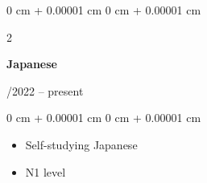 \documentclass[10pt, letterpaper]{article}
\newenvironment{highlights}{
    \begin{itemize}[
        topsep=0.10 cm,
        parsep=0.10 cm,
        partopsep=0pt,
        itemsep=0pt,
        leftmargin=0 cm + 10pt
    ]
}{
    \end{itemize}
}
\newenvironment{onecolentry}{
    \begin{adjustwidth}{
        0 cm + 0.00001 cm
    }{
        0 cm + 0.00001 cm
    }
}{
    \end{adjustwidth}
}
\newenvironment{twocolentry}[2][]{
    \onecolentry
    \def\secondColumn{#2}
    \setcolumnwidth{\fill, 4.5 cm}
    \begin{paracol}{2}
}{
    \switchcolumn \raggedleft \secondColumn
    \end{paracol}
    \endonecolentry
} %
\begin{document}
        \vspace{0.2 cm}

                \begin{twocolentry}{
            07/2022 -- present
        }
            \textbf{Japanese}
        \end{twocolentry}

        \vspace{0.10 cm}
        \begin{onecolentry}
            \begin{highlights}
                \item Self-studying Japanese
                \item N1 level
            \end{highlights}
        \end{onecolentry}
\end{document}

